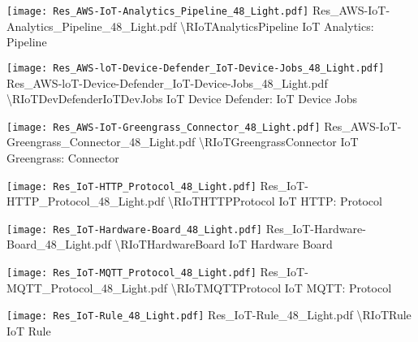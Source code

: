  {\texttt{[image: Res\_AWS-IoT-Analytics\_Pipeline\_48\_Light.pdf]}} {Res\_AWS-IoT-Analytics\_Pipeline\_48\_Light.pdf} {{\textbackslash}RIoTAnalyticsPipeline} {IoT Analytics: Pipeline}

 {\texttt{[image: Res\_AWS-loT-Device-Defender\_IoT-Device-Jobs\_48\_Light.pdf]}} {Res\_AWS-loT-Device-Defender\_IoT-Device-Jobs\_48\_Light.pdf} {{\textbackslash}RIoTDevDefenderIoTDevJobs} {IoT Device Defender: IoT Device Jobs}

 {\texttt{[image: Res\_AWS-IoT-Greengrass\_Connector\_48\_Light.pdf]}} {Res\_AWS-IoT-Greengrass\_Connector\_48\_Light.pdf} {{\textbackslash}RIoTGreengrassConnector} {IoT Greengrass: Connector}

 {\texttt{[image: Res\_IoT-HTTP\_Protocol\_48\_Light.pdf]}} {Res\_IoT-HTTP\_Protocol\_48\_Light.pdf} {{\textbackslash}RIoTHTTPProtocol} {IoT HTTP: Protocol}

 {\texttt{[image: Res\_IoT-Hardware-Board\_48\_Light.pdf]}} {Res\_IoT-Hardware-Board\_48\_Light.pdf} {{\textbackslash}RIoTHardwareBoard} {IoT Hardware Board}

 {\texttt{[image: Res\_IoT-MQTT\_Protocol\_48\_Light.pdf]}} {Res\_IoT-MQTT\_Protocol\_48\_Light.pdf} {{\textbackslash}RIoTMQTTProtocol} {IoT MQTT: Protocol}

 {\texttt{[image: Res\_IoT-Rule\_48\_Light.pdf]}} {Res\_IoT-Rule\_48\_Light.pdf} {{\textbackslash}RIoTRule} {IoT Rule}

